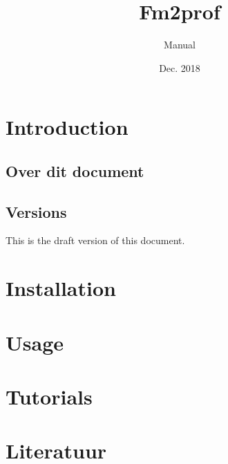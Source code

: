 \documentclass[signature]{deltares_manual}
\begin{document}
\pagestyle{empty}
\cleardoublepage
%
\newcommand{\ProgramName}{Fm2prof\xspace}

\title{\ProgramName}
\subtitle{Manual}
\classification{-}

\date{Dec. 2018}



\summary{}

\authori{}
\revieweri{}
\approvali{}



\deltarestitle


\chapter{Introduction} 
\label{chapterIntroduction}

\section{Over dit document} \label{sec:PurposeAndScope}

\section{Versions}
\label{sec:Versions}
This is the draft version of this document.

\chapter{Installation}
\label{sec:Installation}

\chapter{Usage}
\label{sec:usage}

\chapter{Tutorials}
\label{sec:Tutorials}


\chapter{Literatuur}  \label{chapterLiterature}




\pagestyle{empty}
\mbox{}

\end{document}
